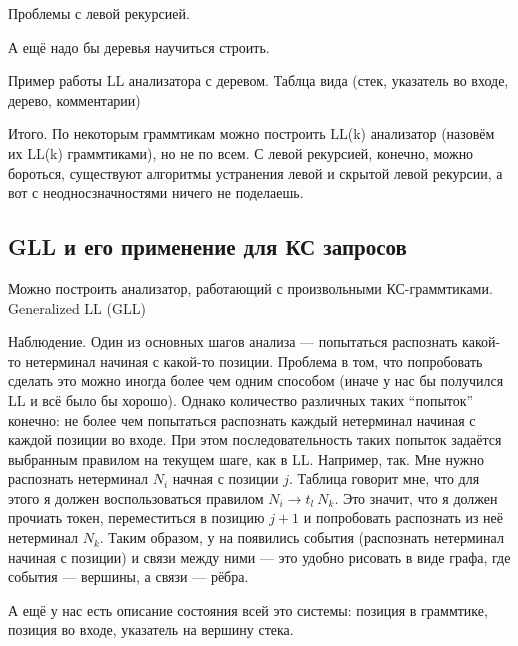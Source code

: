 Проблемы с левой рекурсией.

А ещё надо бы деревья научиться строить.

\begin{example}Пример работы LL анализатора с деревом.
  Таблца вида (стек, указатель во входе, дерево, комментарии)
\end{example}

Итого. По некоторым граммтикам можно построить LL(k) анализатор (назовём их LL(k) граммтиками), но не по всем.
С левой рекурсией, конечно, можно бороться, существуют алгоритмы устранения левой и скрытой левой рекурсии, а вот с неодносзначностями ничего не поделаешь.



\subsection{GLL и его применение для КС запросов}

Можно построить анализатор, работающий с произвольными КС-граммтиками.
Generalized LL (GLL)~\cite{Scott:2010:GP:1860132.1860320,10.1007/978-3-662-46663-6_5}

\begin{definition}
\end{definition}

Наблюдение. Один из основных шагов анализа --- попытаться распознать какой-то нетерминал начиная с какой-то позиции.
Проблема в том, что попробовать сделать это можно иногда более чем одним способом (иначе у нас бы получился LL и всё было бы хорошо). Однако количество различных таких ``попыток'' конечно: не более чем попытаться распознать каждый нетерминал начиная с каждой позиции во входе. При этом последовательность таких попыток задаётся выбранным правилом на текущем шаге, как в LL. Например, так. Мне нужно распознать нетерминал $N_i$ начная с позиции $j$. Таблица говорит мне, что для этого я должен воспользоваться правилом $N_i \to t_l \ N_k$. Это значит, что я должен прочиать токен, переместиться в позицию $j+1$ и попробовать распознать из неё нетерминал $N_k$. Таким образом, у на появились события (распознать нетерминал начиная с позиции) и связи между ними --- это удобно рисовать в виде графа, где события --- вершины, а связи --- рёбра.

А ещё у нас есть описание состояния всей это системы: позиция в граммтике, позиция во входе, указатель на вершину стека.

\begin{definition}[Дескриптор]
\end{definition}

